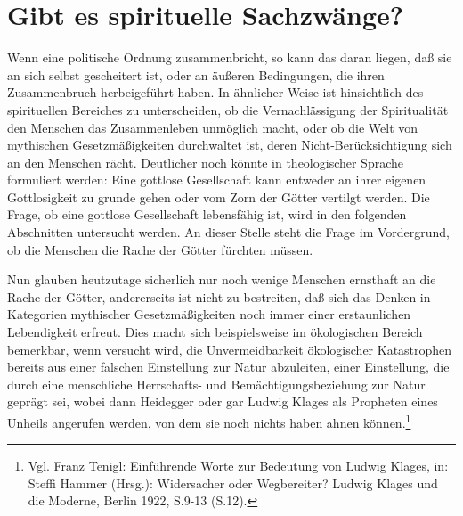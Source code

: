 

\section{Gibt es spirituelle Sachzwänge?}

Wenn eine politische Ordnung zusammenbricht, so kann das daran liegen, daß sie
an sich selbst gescheitert ist, oder an äußeren Bedingungen, die ihren
Zusammenbruch herbeigeführt haben. In ähnlicher Weise ist hinsichtlich des
spirituellen Bereiches zu unterscheiden, ob die Vernachlässigung der
Spiritualität den Menschen das Zusammenleben unmöglich macht, oder ob die Welt
von mythischen Gesetzmäßigkeiten durchwaltet ist, deren Nicht-Berücksichtigung
sich an den Menschen rächt. Deutlicher noch könnte in theologischer Sprache
formuliert werden: Eine gottlose Gesellschaft kann entweder an ihrer eigenen
Gottlosigkeit zu grunde gehen oder vom Zorn der Götter vertilgt werden. Die
Frage, ob eine gottlose Gesellschaft lebensfähig ist, wird in den folgenden
Abschnitten untersucht werden. An dieser Stelle steht die Frage im
Vordergrund, ob die Menschen die Rache der Götter fürchten müssen.

Nun glauben heutzutage sicherlich nur noch wenige Menschen ernsthaft an die
Rache der Götter, andererseits ist nicht zu bestreiten, daß sich das Denken in
Kategorien mythischer Gesetzmäßigkeiten noch immer einer erstaunlichen
Lebendigkeit erfreut. Dies macht sich beispielsweise im ökologischen Bereich
bemerkbar, wenn versucht wird, die Unvermeidbarkeit ökologischer Katastrophen
bereits aus einer falschen Einstellung zur Natur abzuleiten, einer
Einstellung, die durch eine menschliche Herrschafts- und
Bemächtigungsbeziehung zur Natur geprägt sei, wobei dann Heidegger oder gar
Ludwig Klages als Propheten eines Unheils angerufen werden, von dem sie noch
nichts haben ahnen können.\footnote{Vgl. Franz Tenigl: Einführende Worte zur
  Bedeutung von Ludwig Klages, in: Steffi Hammer (Hrsg.): Widersacher oder
  Wegbereiter? Ludwig Klages und die Moderne, Berlin 1922, S.9-13 (S.12).}

